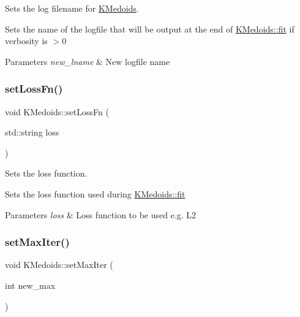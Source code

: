 Sets the log filename for \hyperlink{classKMedoids}{K\+Medoids}. 

Sets the name of the logfile that will be output at the end of \hyperlink{classKMedoids_ae241800e72a6b4a677333ffbf06e1798}{K\+Medoids\+::fit} if verbosity is $>$0


\begin{DoxyParams}{Parameters}
{\em new\+\_\+lname} & New logfile name \\
\hline
\end{DoxyParams}
\mbox{\label{classKMedoids_ab442bf7198be7a48a7eb5901ac7ca571}} 
\subsubsection{\texorpdfstring{set\+Loss\+Fn()}{setLossFn()}}
{\footnotesize\ttfamily void K\+Medoids\+::set\+Loss\+Fn (\begin{DoxyParamCaption}\item[{std\+::string}]{loss }\end{DoxyParamCaption})}



Sets the loss function. 

Sets the loss function used during \hyperlink{classKMedoids_ae241800e72a6b4a677333ffbf06e1798}{K\+Medoids\+::fit}


\begin{DoxyParams}{Parameters}
{\em loss} & Loss function to be used e.\+g. L2 \\
\hline
\end{DoxyParams}
\mbox{\label{classKMedoids_ae1a84d5509090d31cd1c04616fd615f3}} 
\subsubsection{\texorpdfstring{set\+Max\+Iter()}{setMaxIter()}}
{\footnotesize\ttfamily void K\+Medoids\+::set\+Max\+Iter (\begin{DoxyParamCaption}\item[{int}]{new\+\_\+max }\end{DoxyParamCaption})}



